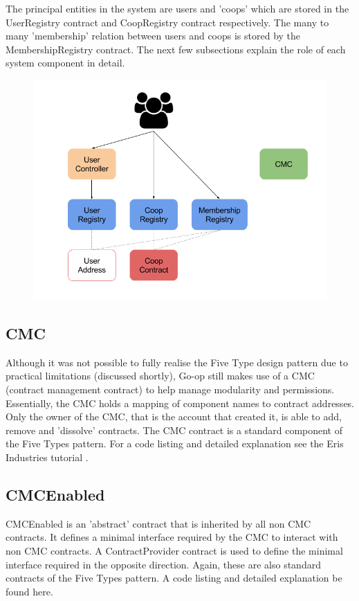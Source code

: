 The principal entities in the system are users and 'coops' which are stored in the UserRegistry contract and CoopRegistry contract respectively. The many to many 'membership' relation between users and coops is stored by the MembershipRegistry contract. The next few subsections explain the role of each system component in detail.\\

\begin{figure}
\centering
\includegraphics[width=\textwidth]{Figures/SCArch}
\decoRule
\caption[]{}
\label{fig:SCArch}
\end{figure}

\subsection{CMC}
Although it was not possible to fully realise the Five Type design pattern due to practical limitations (discussed shortly), Go-op still makes use of a CMC (contract management contract) to help manage modularity and permissions. Essentially, the CMC holds a mapping of component names to contract addresses. Only the owner of the CMC, that is the account that created it, is able to add, remove and 'dissolve' contracts. The CMC contract is a standard component of the Five Types pattern. For a code listing and detailed explanation see the Eris Industries tutorial \cite{FiveTypes}.

\subsection{CMCEnabled}
CMCEnabled is an 'abstract' contract that is inherited by all non CMC contracts. It defines a minimal interface required by the CMC to interact with non CMC contracts. A ContractProvider contract is used to define the minimal interface required in the opposite direction. Again, these are also standard contracts of the Five Types pattern. A code listing and detailed explanation be found here\cite{FiveTypes}.\\

